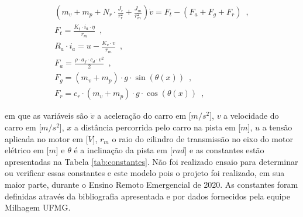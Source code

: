 \begin{subequations}
	\label{eq:modelo_1}
    \begin{align}
        \left( m_v + m_p + N_r \cdot \frac{J_r}{r_r^2}  + \frac{J_m}{r_m^2} \right) \dot v = F_t - (F_a + F_g + F_r) \enspace,\\   
        F_{t} =  \frac{K_t \cdot i_a \cdot \eta}{r_m} \enspace,\\
		R_{a} \cdot i_{a} = u - \frac{K_{v} \cdot v}{r_m} \enspace, \\
        F_{a} = \frac{\rho \cdot a_f \cdot c_d \cdot v^2}{2} \enspace,\\
        F_{g} = (m_v + m_p) \cdot g \cdot \sin(\theta(x)) \enspace,\\
        F_{r}  = c_{r} \cdot (m_v + m_p) \cdot g \cdot \cos(\theta(x)) \enspace,
	\end{align}
\end{subequations}

em que as variáveis são $\dot v$ a aceleração 
do carro em [$m/s^2$], $v$ a velocidade do carro em [$m/s^2$], $x$ a distância  percorrida pelo carro na pista em [$m$], 
$u$ a tensão aplicada no motor em [$V$], $r_m$ o raio do cilindro de transmissão no eixo do motor elétrico em [$m$] e $\theta$ é a inclinação da pista em [$rad$] 
e as constantes estão apresentadas na Tabela \ref{tab:constantes}. Não foi realizado ensaio para determinar ou verificar essas constantes e este modelo
pois o projeto foi realizado, em sua maior parte, durante o Ensino Remoto Emergencial de 2020. As constantes foram definidas através da bibliografia apresentada
e por dados fornecidos pela equipe Milhagem UFMG. 


